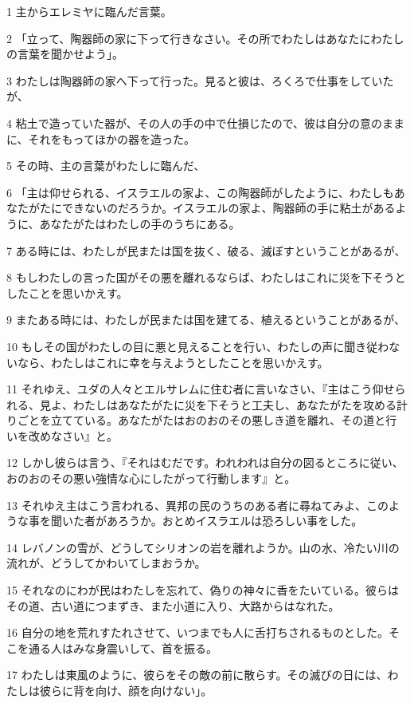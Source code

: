\par 1 主からエレミヤに臨んだ言葉。
\par 2 「立って、陶器師の家に下って行きなさい。その所でわたしはあなたにわたしの言葉を聞かせよう」。
\par 3 わたしは陶器師の家へ下って行った。見ると彼は、ろくろで仕事をしていたが、
\par 4 粘土で造っていた器が、その人の手の中で仕損じたので、彼は自分の意のままに、それをもってほかの器を造った。
\par 5 その時、主の言葉がわたしに臨んだ、
\par 6 「主は仰せられる、イスラエルの家よ、この陶器師がしたように、わたしもあなたがたにできないのだろうか。イスラエルの家よ、陶器師の手に粘土があるように、あなたがたはわたしの手のうちにある。
\par 7 ある時には、わたしが民または国を抜く、破る、滅ぼすということがあるが、
\par 8 もしわたしの言った国がその悪を離れるならば、わたしはこれに災を下そうとしたことを思いかえす。
\par 9 またある時には、わたしが民または国を建てる、植えるということがあるが、
\par 10 もしその国がわたしの目に悪と見えることを行い、わたしの声に聞き従わないなら、わたしはこれに幸を与えようとしたことを思いかえす。
\par 11 それゆえ、ユダの人々とエルサレムに住む者に言いなさい、『主はこう仰せられる、見よ、わたしはあなたがたに災を下そうと工夫し、あなたがたを攻める計りごとを立てている。あなたがたはおのおのその悪しき道を離れ、その道と行いを改めなさい』と。
\par 12 しかし彼らは言う、『それはむだです。われわれは自分の図るところに従い、おのおのその悪い強情な心にしたがって行動します』と。
\par 13 それゆえ主はこう言われる、異邦の民のうちのある者に尋ねてみよ、このような事を聞いた者があろうか。おとめイスラエルは恐ろしい事をした。
\par 14 レバノンの雪が、どうしてシリオンの岩を離れようか。山の水、冷たい川の流れが、どうしてかわいてしまおうか。
\par 15 それなのにわが民はわたしを忘れて、偽りの神々に香をたいている。彼らはその道、古い道につまずき、また小道に入り、大路からはなれた。
\par 16 自分の地を荒れすたれさせて、いつまでも人に舌打ちされるものとした。そこを通る人はみな身震いして、首を振る。
\par 17 わたしは東風のように、彼らをその敵の前に散らす。その滅びの日には、わたしは彼らに背を向け、顔を向けない」。
